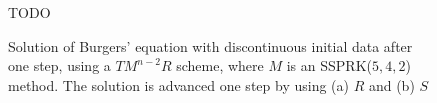 \begin{figure}[t!]
    \centering
	TODO
    \caption{Solution of Burgers' equation with discontinuous initial data 
    after one step, using a $TM^{n-2}R$ scheme, where $M$ is an 
    SSPRK($5,4,2$) method. The solution is advanced one step by using (a) $R$ and 
    (b) $S$}
    \label{fig:burgers_starting_method}
\end{figure}

